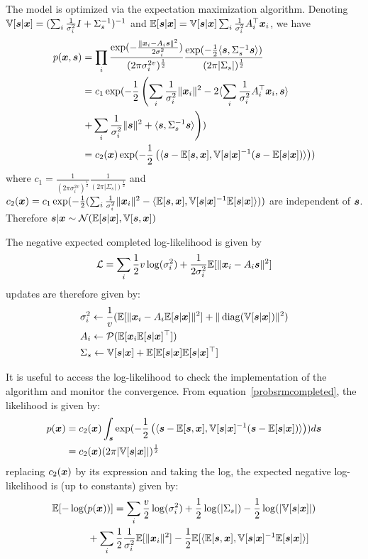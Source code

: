 The model is optimized via the expectation maximization algorithm.
Denoting $\mathbb{V}[\boldsymbol{s} | \boldsymbol{x}] = (\sum_i \frac1{\sigma_i^2} I +
\Sigma_s^{-1})^{-1}$ and $\mathbb{E}[\boldsymbol{s} | \boldsymbol{x}] = \mathbb{V}[\boldsymbol{s} | \boldsymbol{x}] \sum_i \frac1{\sigma_i^2}
A_i^{\top}\boldsymbol{x}_i$, we have
\begin{align}
  p(\boldsymbol{x}, \boldsymbol{s}) &= \prod_i \frac{\exp(-\frac{\|\boldsymbol{x}_i - A_i \boldsymbol{s} \|^2}{2 \sigma_i^2})}{(2 \pi \sigma_i^{2v})^{\frac12}} \frac{\exp(-\frac12 \langle{ \boldsymbol{s}},{ \Sigma_s^{-1} \boldsymbol{s} }\rangle )}{(2 \pi | \Sigma_s|)^{\frac12}} \\
               &= c_1 \exp(-\frac12 \left( \sum_i \frac1{\sigma_i^2}\|\boldsymbol{x}_i\|^2 - 2  \langle{ \sum_i \frac1{\sigma_i^2} A_i^{\top}\boldsymbol{x}_i},{ \boldsymbol{s} }\rangle \right. \\& \left.+ \sum_i \frac1{\sigma_i^2} \| \boldsymbol{s} \|^2 + \langle{ \boldsymbol{s}},{ \Sigma_s^{-1} \boldsymbol{s} }\rangle  \right)) \\
               &= c_2(\boldsymbol{x}) \exp(-\frac12 \left( \langle{  \boldsymbol{s}- \mathbb{E}[\boldsymbol{s}},{ \boldsymbol{x}], \mathbb{V}[\boldsymbol{s} | \boldsymbol{x}]^{-1} ( \boldsymbol{s} - \mathbb{E}[\boldsymbol{s} | \boldsymbol{x}])  }\rangle \right)) \label{probsrmcompleted}
\end{align}
where $c_1 = \frac1{(2 \pi \sigma_i^{2v})^{\frac12}}\frac1{(2 \pi |
  \Sigma_s|)^{\frac12}}$ and $c_2(\boldsymbol{x}) = c_1 \exp(-\frac12( \sum_i
\frac1{\sigma_i^2}\|\boldsymbol{x}_i\|^2 - \langle{  \mathbb{E}[\boldsymbol{s}},{ \boldsymbol{x}], \mathbb{V}[\boldsymbol{s} | \boldsymbol{x}]^{-1} \mathbb{E}[\boldsymbol{s} | \boldsymbol{x}] }\rangle))$ are independent of $\boldsymbol{s}$.
Therefore $\boldsymbol{s}| \boldsymbol{x} \sim \mathcal{N}(\mathbb{E}[\boldsymbol{s} | \boldsymbol{x}], \mathbb{V}[\boldsymbol{s}, \boldsymbol{x}])$

The negative expected completed log-likelihood is given by
\begin{align}
	\mathcal{L} = \sum_i \frac12 v \log(\sigma_i^2) + \frac1{2 \sigma_i^2} \mathbb{E}[\| \boldsymbol{x}_i - A_i \boldsymbol{s} \|^2]
\end{align}
updates are therefore given by:
\begin{align}
&\sigma_i^2 \leftarrow \frac1{v} (\mathbb{E}[\| \boldsymbol{x}_i - A_i \mathbb{E}[\boldsymbol{s}|\boldsymbol{x}]\|^2] + \| \operatorname*{diag}(\mathbb{V}[\boldsymbol{s} | \boldsymbol{x}]) \|^2) \\
  &A_i \leftarrow \mathcal{P}(\mathbb{E}[\boldsymbol{x}_i \mathbb{E}[\boldsymbol{s}|\boldsymbol{x}]^{\top}]) \label{eq:psrm:Aiupdate} \\
  & \Sigma_s \leftarrow \mathbb{V}[\boldsymbol{s} | \boldsymbol{x}] + \mathbb{E}[\mathbb{E}[\boldsymbol{s} | \boldsymbol{x}] \mathbb{E}[\boldsymbol{s} | \boldsymbol{x}]^{\top}]
\end{align}

It is useful to access the log-likelihood to check the implementation of the
algorithm and monitor the convergence. From equation~\eqref{probsrmcompleted},
the likelihood is given by:
\begin{align}
  p(\boldsymbol{x}) &= c_2(\boldsymbol{x}) \int_{\boldsymbol{s}} \exp(-\frac12 \left( \langle{  \boldsymbol{s}- \mathbb{E}[\boldsymbol{s}},{ \boldsymbol{x}], \mathbb{V}[\boldsymbol{s} | \boldsymbol{x}]^{-1} ( \boldsymbol{s} - \mathbb{E}[\boldsymbol{s} | \boldsymbol{x}])  }\rangle \right)) d\boldsymbol{s} \\
         &= c_2(\boldsymbol{x}) (2 \pi |\mathbb{V}[\boldsymbol{s} | \boldsymbol{x}]|)^{\frac12}
\end{align}
replacing $c_2(\boldsymbol{x})$ by its expression and taking the log, the expected negative
log-likelihood is (up to constants) given by:
\begin{align}
  \mathbb{E}[-\log(&p(\boldsymbol{x}))] = \sum_i \frac{v}{2} \log(\sigma_i^2) + \frac12 \log(|\Sigma_s|) - \frac12 \log(|\mathbb{V}[\boldsymbol{s} | \boldsymbol{x}]|) \nonumber \\ &+ \sum_i
  \frac12 \frac1{\sigma_i^2} \mathbb{E}[\|\boldsymbol{x}_i\|^2] - \frac12 \mathbb{E}[\langle{  \mathbb{E}[\boldsymbol{s}},{ \boldsymbol{x}], \mathbb{V}[\boldsymbol{s} | \boldsymbol{x}]^{-1} \mathbb{E}[\boldsymbol{s} | \boldsymbol{x}] }\rangle]
\end{align}

